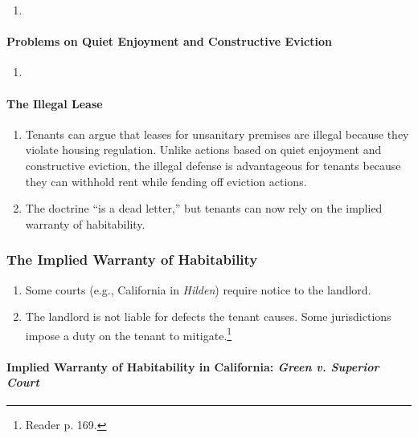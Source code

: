 \begin{enumerate}
    \item %
\end{enumerate}

\paragraph{Problems on Quiet Enjoyment and Constructive Eviction}

\begin{enumerate}
    \item %
\end{enumerate}

\newpage %

\paragraph{The Illegal Lease}

\begin{enumerate}
    \item Tenants can argue that leases for unsanitary premises are illegal 
    because they violate housing regulation. Unlike actions based on quiet 
    enjoyment and constructive eviction, the illegal defense is advantageous 
    for tenants because they can withhold rent while fending off eviction 
    actions.
    \item The doctrine ``is a dead letter,'' but tenants can now rely on the 
    implied warranty of habitability.
\end{enumerate}

\subsubsection{The Implied Warranty of Habitability}

\begin{enumerate}
    \item Some courts (e.g., California in \emph{Hilden}) require notice to 
    the landlord.
    \item The landlord is not liable for defects the tenant causes. Some 
    jurisdictions impose a duty on the tenant to mitigate.\footnote{Reader p. 
    169.}
\end{enumerate}

\paragraph{Implied Warranty of Habitability in California: \emph{Green v. 
Superior Court}}

